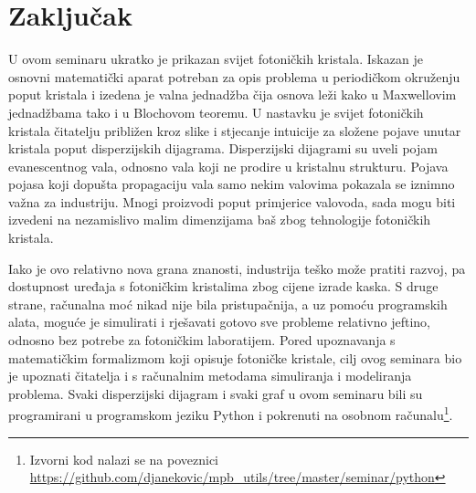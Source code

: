 \documentclass[utf8, seminar, numeric]{fer}
\begin{document}
\chapter{Zaključak}

U ovom seminaru ukratko je prikazan svijet fotoničkih kristala. Iskazan je osnovni
matematički aparat potreban za opis problema u periodičkom okruženju poput
kristala i izedena je valna jednadžba čija osnova leži kako u Maxwellovim
jednadžbama tako i u Blochovom teoremu. U nastavku je svijet fotoničkih kristala
čitatelju približen kroz slike i stjecanje intuicije za složene pojave unutar
kristala poput disperzijskih dijagrama. Disperzijski dijagrami su uveli pojam
evanescentnog vala, odnosno vala koji ne prodire u kristalnu strukturu. Pojava
pojasa koji dopušta propagaciju vala samo nekim valovima pokazala se iznimno
važna za industriju. Mnogi proizvodi poput primjerice valovoda, sada mogu biti
izvedeni na nezamislivo malim dimenzijama baš zbog tehnologije fotoničkih
kristala.

Iako je ovo relativno nova grana znanosti, industrija teško može pratiti
razvoj, pa dostupnost uređaja s fotoničkim kristalima zbog cijene izrade kaska.
S druge strane, računalna moć nikad nije bila pristupačnija, a uz pomoću
programskih alata, moguće je simulirati i rješavati gotovo sve probleme
relativno jeftino, odnosno bez potrebe za fotoničkim laboratijem. Pored
upoznavanja s matematičkim formalizmom koji opisuje fotoničke kristale, cilj ovog
seminara bio je upoznati čitatelja i s računalnim metodama simuliranja i
modeliranja problema. Svaki disperzijski dijagram i svaki graf u ovom seminaru
bili su programirani u programskom jeziku Python i pokrenuti na osobnom
računalu\footnote{ Izvorni kod nalazi se na poveznici
\url{https://github.com/djanekovic/mpb_utils/tree/master/seminar/python}}.




\nocite{*}
\end{document}
